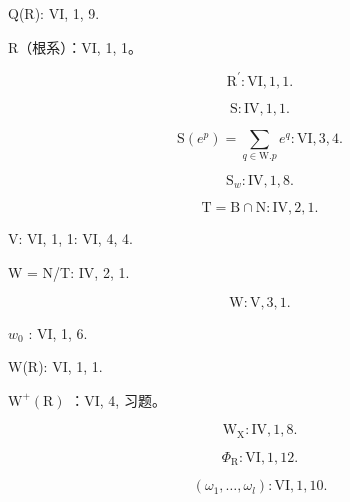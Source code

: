 Q(R): VI, 1, 9.

R（根系）：VI, 1, 1。

\[
\mathrm{R} ^ {\prime}: \mathrm{VI}, 1, 1.
\]

\[
\mathrm{S:IV,1,1.}
\]

\[
\mathrm{S} (e ^ {p}) = \sum_ {q \in \mathrm{W}. p} e ^ {q}: \mathrm{VI}, 3, 4.
\]

\[
\mathrm{S} _ {w}: \mathrm{IV}, 1, 8.
\]

\[
\mathrm{T} = \mathrm{B} \cap \mathrm{N}: \mathrm{IV}, 2, 1.
\]

V: VI, 1, 1: VI, 4, 4.

W = N/T: IV, 2, 1.

\[
\mathrm{W}: \mathrm{V}, 3, 1.
\]

\(w_{0}\) : VI, 1, 6.

W(R): VI, 1, 1.

\(\mathrm{W}^{+}(\mathrm{R})\) ：VI, 4, 习题。

\[
\mathrm{W} _ {\mathrm{X}}: \mathrm{IV}, 1, 8.
\]

\[
\Phi_ {\mathrm{R}}: \mathrm{VI}, 1, 12.
\]

\[
(\omega_ {1}, \dots , \omega_ {l}) \colon \mathrm{VI,1,10.}
\]

